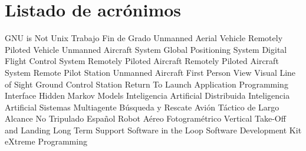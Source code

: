 \chapter{Listado de acrónimos}

{\small
\begin{acronym}[TFG]
       {\acs{GNU} is Not Unix}
       {Trabajo Fin de Grado}
       {Unmanned Aerial Vehicle}
       {Remotely Piloted Vehicle}
       {Unmanned Aircraft System}
       {Global Positioning System}
      {Digital Flight Control System}
       {Remotely Piloted Aircraft}
      {Remotely Piloted Aircraft System}
       {Remote Pilot Station}
        {Unmanned Aircraft} 
       {First Person View}
      {Visual Line of Sight} 
       {Ground Control Station}
       {Return To Launch}
       {Application Programming Interface}
       {Hidden Markov Models}
       {Inteligencia Artificial Distribuida}
  	 {Inteligencia Artificial}
  	 {Sistemas Multiagente}
       {Búsqueda y Rescate}
   {Avión Táctico de Largo Alcance No Tripulado Español}
  	 {Robot Aéreo Fotogramétrico}
  	 {Vertical Take-Off and Landing}
  	 {Long Term Support}
  	 {Software in the Loop}
  	 {Software Development Kit}
  	 {eXtreme Programming}
\end{acronym}
}




